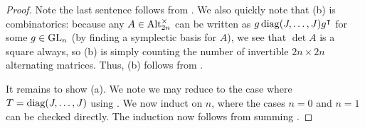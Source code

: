 \begin{proof}
    Note the last sentence follows from . We also quickly note that (b) is combinatorics: because any $A\in\operatorname{Alt}_{2n}^\times$ can be written as $g\operatorname{diag}(J,\ldots,J)g^\intercal$ for some $g\in\operatorname{GL}_n$ (by finding a symplectic basis for $A$), we see that $\det A$ is a square always, so (b) is simply counting the number of invertible $2n\times2n$ alternating matrices. Thus, (b) follows from \cite[Theorem~7.5.5]{hach-gf}.
    
    It remains to show (a). We note we may reduce to the case where $T=\operatorname{diag}(J,\ldots,J)$ using . We now induct on $n$, where the cases $n=0$ and $n=1$ can be checked directly. The induction now follows from summing .
\end{proof}
